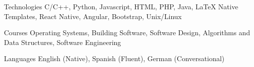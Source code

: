 


\begin{cvskills}


\cvskill
{Technologies} %
{C/C++, Python, Javascript, HTML, PHP, Java, LaTeX {\enskip\cdotp\enskip} Native Templates, React Native, Angular, Bootstrap, Unix/Linux}%

\cvskill
{Courses}
{Operating Systems, Building Software, Software Design, Algorithms and Data Structures, Software Engineering}

\cvskill
{Languages} %
{English (Native), Spanish (Fluent), German (Conversational)} %


\end{cvskills}